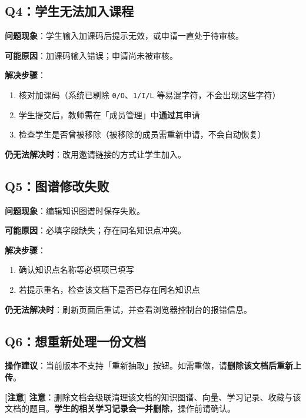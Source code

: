 \documentclass[UTF8,a4paper,11pt]{ctexrep}
\newcommand{\warnmark}{\textcolor{todobar}{\textbf{[注意]}}}
\begin{document}
\subsection{Q4：学生无法加入课程}

\textbf{问题现象}：学生输入加课码后提示无效，或申请一直处于待审核。

\textbf{可能原因}：加课码输入错误；申请尚未被审核。

\textbf{解决步骤}：

\begin{enumerate}
\item 核对加课码（系统已剔除 \texttt{0/O}、\texttt{1/I/L} 等易混字符，不会出现这些字符）
\item 学生提交后，教师需在「成员管理」中\textbf{通过}其申请
\item 检查学生是否曾被移除（被移除的成员需重新申请，不会自动恢复）
\end{enumerate}
\textbf{仍无法解决时}：改用邀请链接的方式让学生加入。


\subsection{Q5：图谱修改失败}

\textbf{问题现象}：编辑知识图谱时保存失败。

\textbf{可能原因}：必填字段缺失；存在同名知识点冲突。

\textbf{解决步骤}：

\begin{enumerate}
\item 确认知识点名称等必填项已填写
\item 若提示重名，检查该文档下是否已存在同名知识点
\end{enumerate}
\textbf{仍无法解决时}：刷新页面后重试，并查看浏览器控制台的报错信息。


\subsection{Q6：想重新处理一份文档}

\textbf{操作建议}：当前版本不支持「重新抽取」按钮。如需重做，请\textbf{删除该文档后重新上传}。

\begin{todobox}
\warnmark{} \textbf{注意}：删除文档会级联清理该文档的知识图谱、向量、学习记录、收藏与该文档的题目。\textbf{学生的相关学习记录会一并删除}，操作前请确认。

\end{todobox}
\end{document}
